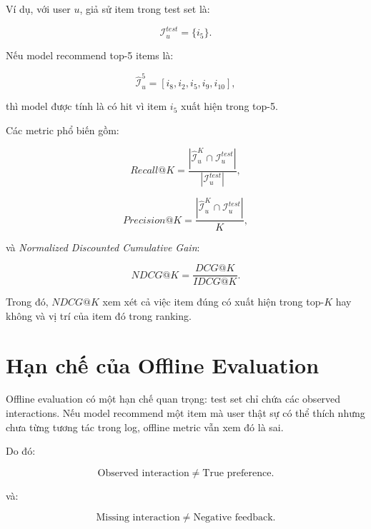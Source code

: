 \documentclass[12pt,a4paper]{article}
\begin{document}
Ví dụ, với user $u$, giả sử item trong test set là:

\begin{equation}
\mathcal{I}^{test}_u = \{i_5\}.
\end{equation}

Nếu model recommend top-5 items là:

\begin{equation}
\hat{\mathcal{I}}^5_u = [i_8, i_2, i_5, i_9, i_{10}],
\end{equation}

thì model được tính là có hit vì item $i_5$ xuất hiện trong top-5.

Các metric phổ biến gồm:

\begin{equation}
Recall@K = \frac{|\hat{\mathcal{I}}^K_u \cap \mathcal{I}^{test}_u|}{|\mathcal{I}^{test}_u|},
\end{equation}

\begin{equation}
Precision@K = \frac{|\hat{\mathcal{I}}^K_u \cap \mathcal{I}^{test}_u|}{K},
\end{equation}

và \textit{Normalized Discounted Cumulative Gain}:

\begin{equation}
NDCG@K = \frac{DCG@K}{IDCG@K}.
\end{equation}

Trong đó, $NDCG@K$ xem xét cả việc item đúng có xuất hiện trong top-$K$ hay không và vị trí của item đó trong ranking.

\section{Hạn chế của Offline Evaluation}

Offline evaluation có một hạn chế quan trọng: test set chỉ chứa các observed interactions. 
Nếu model recommend một item mà user thật sự có thể thích nhưng chưa từng tương tác trong log, offline metric vẫn xem đó là sai.

Do đó:

\begin{equation}
\text{Observed interaction} \neq \text{True preference}.
\end{equation}

và:

\begin{equation}
\text{Missing interaction} \neq \text{Negative feedback}.
\end{equation}
\end{document}
